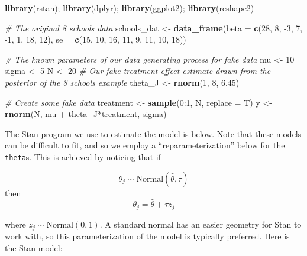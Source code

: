 \documentclass[]{book}
\newenvironment{Shaded}{\begin{snugshade}}{\end{snugshade}}
\newcommand{\KeywordTok}[1]{\textcolor[rgb]{0.13,0.29,0.53}{\textbf{{#1}}}}
\newcommand{\DataTypeTok}[1]{\textcolor[rgb]{0.13,0.29,0.53}{{#1}}}
\newcommand{\DecValTok}[1]{\textcolor[rgb]{0.00,0.00,0.81}{{#1}}}
\newcommand{\FloatTok}[1]{\textcolor[rgb]{0.00,0.00,0.81}{{#1}}}
\newcommand{\StringTok}[1]{\textcolor[rgb]{0.31,0.60,0.02}{{#1}}}
\newcommand{\CommentTok}[1]{\textcolor[rgb]{0.56,0.35,0.01}{\textit{{#1}}}}
\newcommand{\NormalTok}[1]{{#1}}
\begin{document}
\begin{Shaded}
\begin{Highlighting}[]
\KeywordTok{library}\NormalTok{(rstan); }\KeywordTok{library}\NormalTok{(dplyr); }\KeywordTok{library}\NormalTok{(ggplot2); }\KeywordTok{library}\NormalTok{(reshape2)}

\CommentTok{# The original 8 schools data}
\NormalTok{schools_dat <-}\StringTok{ }\KeywordTok{data_frame}\NormalTok{(}\DataTypeTok{beta =} \KeywordTok{c}\NormalTok{(}\DecValTok{28}\NormalTok{,  }\DecValTok{8}\NormalTok{, -}\DecValTok{3}\NormalTok{,  }\DecValTok{7}\NormalTok{, -}\DecValTok{1}\NormalTok{,  }\DecValTok{1}\NormalTok{, }\DecValTok{18}\NormalTok{, }\DecValTok{12}\NormalTok{),}
                          \DataTypeTok{se =} \KeywordTok{c}\NormalTok{(}\DecValTok{15}\NormalTok{, }\DecValTok{10}\NormalTok{, }\DecValTok{16}\NormalTok{, }\DecValTok{11}\NormalTok{,  }\DecValTok{9}\NormalTok{, }\DecValTok{11}\NormalTok{, }\DecValTok{10}\NormalTok{, }\DecValTok{18}\NormalTok{))}

\CommentTok{# The known parameters of our data generating process for fake data}
\NormalTok{mu <-}\StringTok{ }\DecValTok{10}
\NormalTok{sigma <-}\StringTok{ }\DecValTok{5}
\NormalTok{N <-}\StringTok{ }\DecValTok{20}
\CommentTok{# Our fake treatment effect estimate drawn from the posterior of the 8 schools example}
\NormalTok{theta_J <-}\StringTok{ }\KeywordTok{rnorm}\NormalTok{(}\DecValTok{1}\NormalTok{, }\DecValTok{8}\NormalTok{, }\FloatTok{6.45}\NormalTok{) }

\CommentTok{# Create some fake data}
\NormalTok{treatment <-}\StringTok{ }\KeywordTok{sample}\NormalTok{(}\DecValTok{0}\NormalTok{:}\DecValTok{1}\NormalTok{, N, }\DataTypeTok{replace =} \NormalTok{T)}
\NormalTok{y <-}\StringTok{ }\KeywordTok{rnorm}\NormalTok{(N, mu +}\StringTok{ }\NormalTok{theta_J*treatment, sigma)}
\end{Highlighting}
\end{Shaded}

The Stan program we use to estimate the model is below. Note that these
models can be difficult to fit, and so we employ a
``reparameterization'' below for the \texttt{theta}s. This is achieved
by noticing that if

\[
\theta_{j} \sim \mbox{Normal}\left(\hat{\theta}, \tau\right)
\] then \[
\theta_{j} = \hat{\theta} + \tau z_{j}
\]

where \(z_{j}\sim\mbox{Normal}(0,1)\). A standard normal has an easier
geometry for Stan to work with, so this parameterization of the model is
typically preferred. Here is the Stan model:
\end{document}
